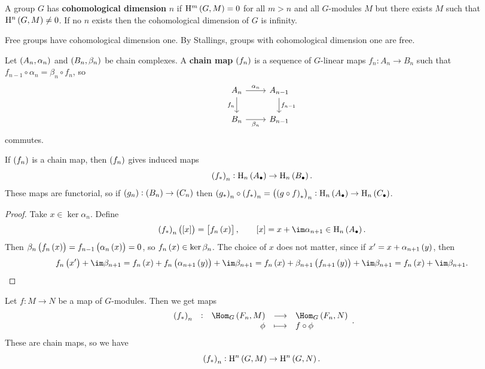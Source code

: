 \begin{definition}
A group $ G $ has \textbf{cohomological dimension} $ n $ if $ \H^m\br{G, M} = 0 $ for all $ m > n $ and all $ G $-modules $ M $ but there exists $ M $ such that $ \H^n\br{G, M} \ne 0 $. If no $ n $ exists then the cohomological dimension of $ G $ is infinity.
\end{definition}

Free groups have cohomological dimension one. By Stallings, groups with cohomological dimension one are free.

\begin{definition}
Let $ \br{A_n, \alpha_n} $ and $ \br{B_n, \beta_n} $ be chain complexes. A \textbf{chain map} $ \br{f_n} $ is a sequence of $ G $-linear maps $ f_n : A_n \to B_n $ such that $ f_{n - 1} \circ \alpha_n = \beta_n \circ f_n $, so
$$
\begin{tikzcd}
A_n \arrow{r}{\alpha_n} \arrow{d}[swap]{f_n} & A_{n - 1} \arrow{d}{f_{n - 1}} \\
B_n \arrow{r}[swap]{\beta_n} & B_{n - 1}
\end{tikzcd}
$$
commutes.
\end{definition}

\begin{proposition}
If $ \br{f_n} $ is a chain map, then $ \br{f_n} $ gives induced maps
$$ \br{f_*}_n : \H_n\br{A_\bullet} \to \H_n\br{B_\bullet}. $$
These maps are functorial, so if $ \br{g_n} : \br{B_n} \to \br{C_n} $ then $ \br{g_*}_n \circ \br{f_*}_n = \br{\br{g \circ f}_*}_n : \H_n\br{A_\bullet} \to \H_n\br{C_\bullet} $.
\end{proposition}

\begin{proof}
Take $ x \in \ker \alpha_n $. Define
$$ \br{f_*}_n\br{\sbr{x}} = \sbr{f_n\br{x}}, \qquad \sbr{x} = x + \im \alpha_{n + 1} \in \H_n\br{A_\bullet}. $$
Then $ \beta_n\br{f_n\br{x}} = f_{n - 1}\br{\alpha_n\br{x}} = 0 $, so $ f_n\br{x} \in \ker \beta_n $. The choice of $ x $ does not matter, since if $ x' = x + \alpha_{n + 1}\br{y} $, then
$$ f_n\br{x'} + \im \beta_{n + 1} = f_n\br{x} + f_n\br{\alpha_{n + 1}\br{y}} + \im \beta_{n + 1} = f_n\br{x} + \beta_{n + 1}\br{f_{n + 1}\br{y}} + \im \beta_{n + 1} = f_n\br{x} + \im \beta_{n + 1}. $$
\end{proof}

\begin{corollary}
Let $ f : M \to N $ be a map of $ G $-modules. Then we get maps
$$ \function[\br{f_*}_n]{\Hom_G\br{F_n, M}}{\Hom_G\br{F_n, N}}{\phi}{f \circ \phi}. $$
These are chain maps, so we have
$$ \br{f_*}_n : \H^n\br{G, M} \to \H^n\br{G, N}. $$
\end{corollary}

